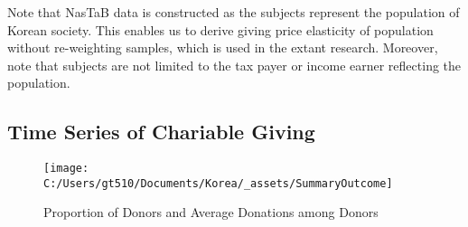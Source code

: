 \documentclass[ review  , 3p ]{elsarticle}
\begin{document}
  Note that NasTaB data is constructed as the subjects represent the population of Korean society. This enables us to derive giving price elasticity of population without re-weighting samples, which is used in the extant research. Moreover, note that subjects are not limited to the tax payer or income earner reflecting the population.
  
  \hypertarget{time-series-of-chariable-giving}{%
  \subsection{Time Series of Chariable Giving}\label{time-series-of-chariable-giving}}
  
  \begin{figure}
  
  {\centering \texttt{[image: C:/Users/gt510/Documents/Korea/\_assets/SummaryOutcome]} 
  
  }
  
  \caption{Proportion of Donors and Average Donations among Donors}\label{fig:figDonationRate}
  \end{figure}
  
\end{document}

